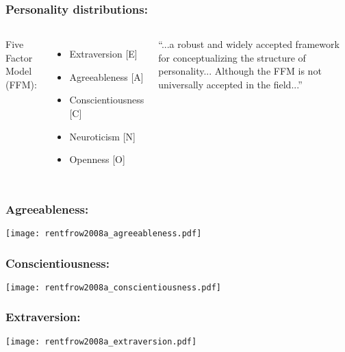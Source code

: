 

\begin{frame}
  \small
  \frametitle{Personality distributions:}

  \begin{block}{}
  \end{block}

  \bigskip

  \begin{columns}
    Five Factor Model (FFM):
    \begin{itemize}
    \item 
      Extraversion [E]
    \item 
      Agreeableness [A]
    \item 
      Conscientiousness [C]
    \item 
      Neuroticism [N]
    \item 
      Openness [O]
    \end{itemize}
    ``...a robust and widely accepted framework for 
    conceptualizing the structure of personality...
    Although the FFM is not universally accepted in the field...''\cite{rentfrow2008a}

    \medskip

  \end{columns}
\end{frame}

\begin{frame}
  \frametitle{Agreeableness:}

  \texttt{[image: rentfrow2008a\_agreeableness.pdf]}

\end{frame}

\begin{frame}
  \frametitle{Conscientiousness:}

  \texttt{[image: rentfrow2008a\_conscientiousness.pdf]}

\end{frame}

\begin{frame}
  \frametitle{Extraversion:}

  \texttt{[image: rentfrow2008a\_extraversion.pdf]}

\end{frame}

